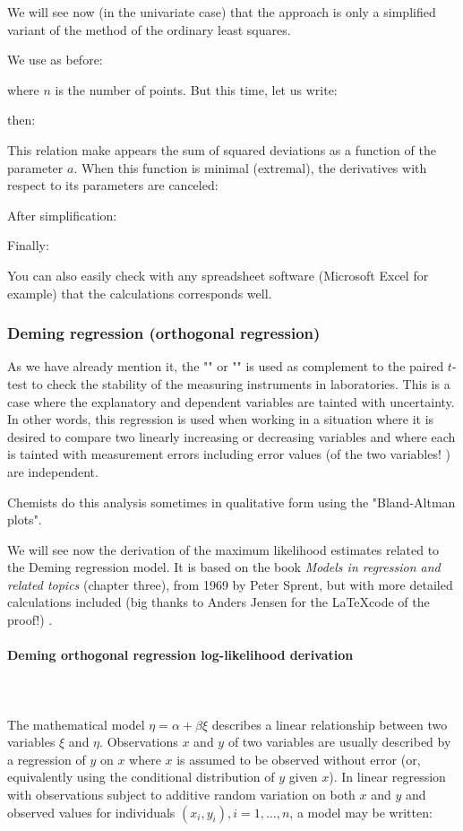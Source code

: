 	We will see now (in the univariate case) that the approach is only a simplified variant of the method of the ordinary least squares.
	
	We use as before:
	
	where $n$ is the number of points. But this time, let us write:
	
	then:	
	
	This relation make appears the sum of squared deviations as a function of the parameter $a$. When this function is minimal (extremal), the derivatives with respect to its parameters are canceled:
	
	After simplification:
	
	Finally:
	
	You can also easily check with any spreadsheet software (Microsoft Excel for example) that the calculations corresponds well.
	
	\pagebreak
	\subsubsection{Deming regression (orthogonal regression)}
	As we have already mention it, the ""  or ""  is used as complement to the paired $t$-test to check the stability of the measuring instruments in laboratories. This is a case where the explanatory and dependent variables are tainted with uncertainty. In other words, this regression is used when working in a situation where it is desired to compare two linearly increasing or decreasing variables and where each is tainted with measurement errors including error values (of the two variables! ) are independent.
	\begin{tcolorbox}[title=Remark,colframe=black,arc=10pt]
	Chemists do this analysis sometimes in qualitative form using the "Bland-Altman plots".
	\end{tcolorbox}	

	We will see now the derivation of the maximum likelihood estimates related to the Deming regression model. It is based on the book \textit{Models in regression and related topics} (chapter three), from 1969 by Peter Sprent, but with more detailed calculations included (big thanks to Anders Jensen for the \LaTeX code of the proof!)
	.
	\paragraph{Deming orthogonal regression log-likelihood derivation}\mbox{}\\\\
	The mathematical model $\eta=\alpha+\beta\xi$ describes a linear
	relationship between two variables $\xi$ and $\eta$. Observations $x$
	and $y$ of two variables are usually described by a regression of $y$
	on $x$ where $x$ is assumed to be observed without error (or,
	equivalently using the conditional distribution of $y$ given $x$). In
	linear regression with observations subject to additive random
	variation on both $x$ and $y$ and observed values for individuals
	$(x_i,y_i), i=1,\ldots,n$, a model may be written:
	
